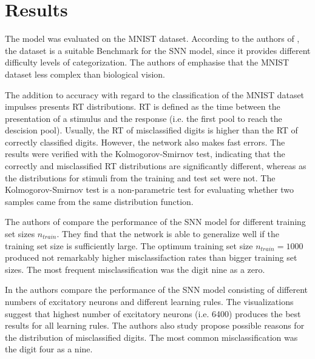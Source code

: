 \section{Results}
\label{sec:result}
The model was evaluated on the MNIST dataset.
According to the authors of \cite{STDP_like}, the dataset is a suitable Benchmark for the \ac{SNN} model, 
since it provides different difficulty levels of categorization.
The authors of \cite{STDP_like} emphasise that the MNIST dataset less complex than biological vision.

The addition to accuracy with regard to the classification of the MNIST dataset impulses \cite{STDP_like} presents \ac{RT} distributions.
\ac{RT} is defined as the time between the presentation of a stimulus and the response (i.e. the first pool to reach the descision pool).
Usually, the \ac{RT} of misclassified digits is higher than the \ac{RT} of correctly classified digits.
However, the network also makes fast errors.
The results were verified with the Kolmogorov-Smirnov test, 
indicating that the correctly and misclassified \ac{RT} distributions are significantly different, 
whereas as the distributions for stimuli from the training and test set were not.
The Kolmogorov-Smirnov test \cite{Kolmogorov_Smirnov} is a non-parametric test for evaluating whether two samples came from the same distribution function.

The authors of \cite{STDP_like} compare the performance of the \ac{SNN} model for different training set sizes $n_{train}$.
They find that the network is able to generalize well if the training set size is sufficiently large.
The optimum training set size $n_{train} = 1000$ produced not remarkably higher misclassifaction rates than bigger training set sizes.
The most frequent misclassification was the digit nine as a zero.


In \cite{SNN} the authors compare the performance of the \ac{SNN} model consisting of different numbers of excitatory neurons and different learning rules.
The visualizations suggest that highest number of excitatory neurons (i.e. 6400) produces the best results for all learning rules.
The authors also study propose possible reasons for the distribution of misclassified digits.
The most common misclassification was the digit four as a nine.

